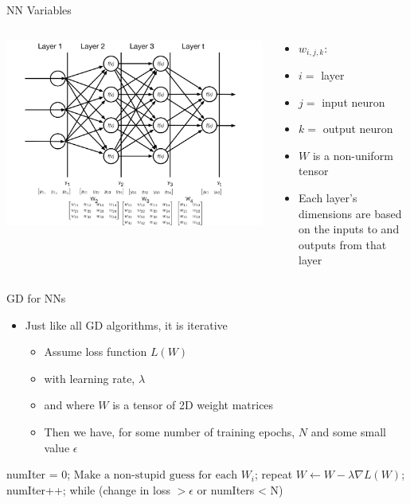 \documentclass[aspectratio=169]{beamer}
\begin{document}
\begin{frame}{NN Variables}

\begin{columns}
\begin{column}{0.75\textwidth}
\includegraphics[width=.85\textwidth]{lectFF/nnEval.pdf}
\end{column}
\begin{column}{0.35\textwidth}
\begin{itemize}
\item $w_{i,j,k}$:
\item $i = $ layer
\item $j = $ input neuron
\item $k = $ output neuron
\item $W$ is a non-uniform tensor
\item Each layer's dimensions are based on the inputs to and outputs from that layer
\end{itemize}
\end{column}
\end{columns}
\end{frame}
\begin{frame}[fragile]{GD for NNs}

\begin{itemize}
	\item Just like all GD algorithms, it is iterative
	\begin{itemize}
	\item Assume loss function $L(W)$
	\item with learning rate, $\lambda$ 
	\item and where $W$ is a tensor of 2D weight matrices
	\item Then we have, for some number of training epochs, $N$ and some small value $\epsilon$
	\end{itemize}
\end{itemize}

\begin{SQL}
numIter = 0;
$\textrm{Make a non-stupid guess for each } W_i$;
repeat {
  $W \leftarrow W - \lambda \nabla L (W)$;
  numIter++;
} while (change in loss $> \epsilon$ or numIters < N)
\end{SQL}
\end{frame}
\end{document}
